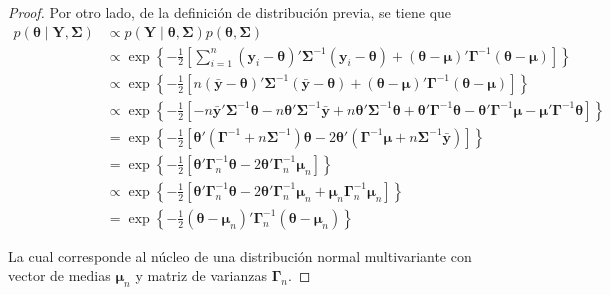 \documentclass[
  10pt,
  spanish,
]{book}
\theoremstyle{definition}
\theoremstyle{definition}
\theoremstyle{definition}
\theoremstyle{definition}
\theoremstyle{remark}
\begin{document}
\begin{proof}
Por otro lado, de la definición de distribución previa, se tiene que
\begin{align*}
p(\boldsymbol \theta\mid \mathbf{Y},\boldsymbol \Sigma)
&\propto p(\mathbf{Y} \mid \boldsymbol \theta,\boldsymbol \Sigma)p(\boldsymbol \theta,\boldsymbol \Sigma)\\
&\propto \exp\left\{-\frac{1}{2}\left[\sum_{i=1}^n(\mathbf{y}_i-\boldsymbol \theta)'\boldsymbol \Sigma^{-1}(\mathbf{y}_i-\boldsymbol \theta)+(\boldsymbol \theta-\boldsymbol \mu)'\boldsymbol \Gamma^{-1}(\boldsymbol \theta-\boldsymbol \mu)\right]\right\}\\
&\propto \exp\left\{-\frac{1}{2}\left[n(\bar{\mathbf{y}}-\boldsymbol \theta)'\boldsymbol \Sigma^{-1}(\bar{\mathbf{y}}-\boldsymbol \theta)+(\boldsymbol \theta-\boldsymbol \mu)'\boldsymbol \Gamma^{-1}(\boldsymbol \theta-\boldsymbol \mu)\right]\right\}\\
&\propto \exp\left\{-\frac{1}{2}\left[
  -n\bar{\mathbf{y}}'\boldsymbol \Sigma^{-1}\boldsymbol \theta-n\boldsymbol \theta'\boldsymbol \Sigma^{-1}\bar{\mathbf{y}}+n\boldsymbol \theta'\boldsymbol \Sigma^{-1}\boldsymbol \theta+\boldsymbol \theta'\boldsymbol \Gamma^{-1}\boldsymbol \theta-\boldsymbol \theta'\boldsymbol \Gamma^{-1}\boldsymbol \mu-\boldsymbol \mu'\boldsymbol \Gamma^{-1}\boldsymbol \theta\right]\right\}\\
&= \exp\left\{-\frac{1}{2}\left[
  \boldsymbol \theta'(\boldsymbol \Gamma^{-1}+n\boldsymbol \Sigma^{-1})\boldsymbol \theta-2\boldsymbol \theta'(\boldsymbol \Gamma^{-1}\boldsymbol \mu+n\boldsymbol \Sigma^{-1}\bar{\mathbf{y}})\right]\right\}\\
&= \exp\left\{-\frac{1}{2}\left[\boldsymbol \theta'\boldsymbol \Gamma^{-1}_n\boldsymbol \theta-2\boldsymbol \theta'\boldsymbol \Gamma^{-1}_n\boldsymbol \mu_n\right]\right\}\\
&\propto \exp\left\{-\frac{1}{2}\left[\boldsymbol \theta'\boldsymbol \Gamma^{-1}_n\boldsymbol \theta-2\boldsymbol \theta'\boldsymbol \Gamma^{-1}_n\boldsymbol \mu_n+\boldsymbol \mu_n\boldsymbol \Gamma_n^{-1}\boldsymbol \mu_n\right]\right\}\\
&= \exp\left\{-\frac{1}{2}(\boldsymbol \theta-\boldsymbol \mu_n)'\boldsymbol \Gamma_n^{-1}(\boldsymbol \theta-\boldsymbol \mu_n)\right\}
  \end{align*}

La cual corresponde al núcleo de una distribución normal multivariante con vector de medias \(\boldsymbol \mu_n\) y matriz de varianzas \(\boldsymbol \Gamma_n\).
\end{proof}
\end{document}
